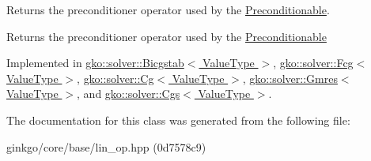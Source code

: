 Returns the preconditioner operator used by the \hyperlink{classgko_1_1Preconditionable}{Preconditionable}. 

\begin{DoxyReturn}{Returns}
the preconditioner operator used by the \hyperlink{classgko_1_1Preconditionable}{Preconditionable} 
\end{DoxyReturn}


Implemented in \hyperlink{classgko_1_1solver_1_1Bicgstab_ac16d32672fbc91d8cfd7c0607c9771db}{gko\+::solver\+::\+Bicgstab$<$ Value\+Type $>$}, \hyperlink{classgko_1_1solver_1_1Fcg_a2dec8d13548e8b316d6598c9ee8b0881}{gko\+::solver\+::\+Fcg$<$ Value\+Type $>$}, \hyperlink{classgko_1_1solver_1_1Cg_a797544ecc8d86d2798014e7f5f5baf4f}{gko\+::solver\+::\+Cg$<$ Value\+Type $>$}, \hyperlink{classgko_1_1solver_1_1Gmres_ac2e3e0024a37647eda9f8a7f5b4cefb4}{gko\+::solver\+::\+Gmres$<$ Value\+Type $>$}, and \hyperlink{classgko_1_1solver_1_1Cgs_ad349dc1381dfdcb7a47223908806dcc7}{gko\+::solver\+::\+Cgs$<$ Value\+Type $>$}.



The documentation for this class was generated from the following file\+:\begin{DoxyCompactItemize}
\item 
ginkgo/core/base/lin\+\_\+op.\+hpp (0d7578c9)\end{DoxyCompactItemize}
